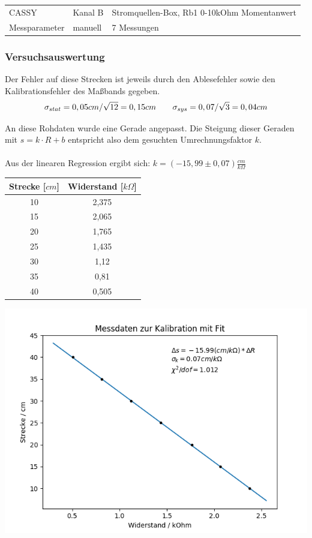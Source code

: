 \documentclass[a4paper]{article}
\begin{document}
	\begin{tabular}{l l l}
		
		CASSY & Kanal B & Stromquellen-Box, Rb1 0-10kOhm Momentanwert \\ 
		 
		Messparameter & manuell &  7 Messungen\\ 
		
	\end{tabular} 
	
	\subsubsection{Versuchsauswertung}
	Der Fehler auf diese Strecken ist jeweils durch den Ablesefehler sowie den Kalibrationsfehler des Maßbands gegeben.
	\begin{equation}
	\sigma _{stat} = 0,05cm / \sqrt{12} = 0,15cm \text{\qquad} \sigma_{sys} = 0,07 / \sqrt{3} = 0,04cm
	\end{equation}

	An diese Rohdaten wurde eine Gerade angepasst. Die Steigung dieser Geraden mit $s=k\cdot R+b$ entspricht also dem gesuchten Umrechnungsfaktor $k$.\\\\
	Aus der linearen Regression ergibt sich: $ k = (-15,99 \pm 0,07) \frac{cm}{k\Omega}$
	\begin{center}
        \begin{tabular}{|c|c|}
        	\hline
	        \textbf{Strecke [$cm$]} & \textbf{Widerstand [$k\Omega$]} \\
	        \hline
	        10 & 2,375 \\
			\hline
			15 & 2,065 \\
			\hline
			20 & 1,765 \\
			\hline
			25 & 1,435 \\
			\hline
			30 & 1,12 \\
			\hline
			35 & 0,81 \\
			\hline
			40 & 0,505 \\
			\hline		
		\end{tabular}
	\end{center}
	\begin{center}
		\includegraphics[width=0.7\linewidth]{kalibration_poti_fit}
	\end{center}
		
\end{document}
